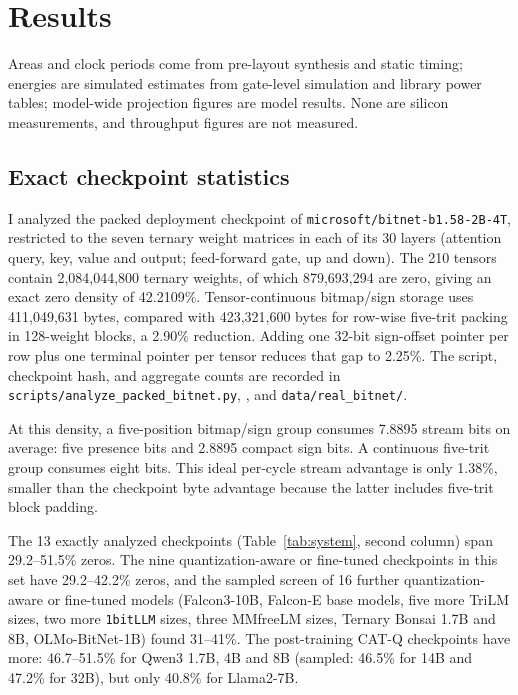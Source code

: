 \documentclass[11pt]{article}
\begin{document}
\section{Results}
\label{sec:results}

Areas and clock periods come from pre-layout synthesis and static timing; energies are simulated estimates from gate-level simulation and library power tables; model-wide projection figures are model results. None are silicon measurements, and throughput figures are not measured.

\subsection{Exact checkpoint statistics}

I analyzed the packed deployment checkpoint of
\texttt{microsoft/bitnet-b1.58-2B-4T}, restricted to the seven ternary
weight matrices in each of its 30 layers (attention query, key, value and
output; feed-forward gate, up and down). The 210 tensors contain
2,084,044,800 ternary weights, of which 879,693,294 are zero, giving an exact
zero density of 42.2109\%. Tensor-continuous bitmap/sign storage uses 411,049,631
bytes, compared with 423,321,600 bytes for row-wise five-trit packing in
128-weight blocks, a 2.90\% reduction. Adding one 32-bit sign-offset pointer
per row plus one terminal pointer per tensor reduces that gap to 2.25\%. The script, checkpoint hash, and aggregate
counts are recorded in \texttt{scripts/analyze\_packed\_bitnet.py},
, and \texttt{data/real\_bitnet/}.

At this density, a five-position bitmap/sign group consumes 7.8895 stream
bits on average: five presence bits and 2.8895 compact sign bits. A continuous
five-trit group consumes eight bits. This ideal per-cycle stream advantage is
only 1.38\%, smaller than the checkpoint byte advantage because the latter
includes five-trit block padding.

The 13 exactly analyzed checkpoints (Table~\ref{tab:system}, second
column) span 29.2--51.5\% zeros. The nine quantization-aware or fine-tuned
checkpoints in this set have 29.2--42.2\% zeros, and the
sampled screen of 16 further quantization-aware or fine-tuned models (Falcon3-10B,
Falcon-E base models, five more TriLM sizes, two more \texttt{1bitLLM}
sizes, three MMfreeLM sizes, Ternary Bonsai 1.7B and 8B, OLMo-BitNet-1B)
found 31--41\%. The post-training CAT-Q checkpoints have more: 46.7--51.5\%
for Qwen3 1.7B, 4B and 8B (sampled: 46.5\% for 14B and 47.2\% for 32B),
but only 40.8\% for Llama2-7B.
\end{document}
